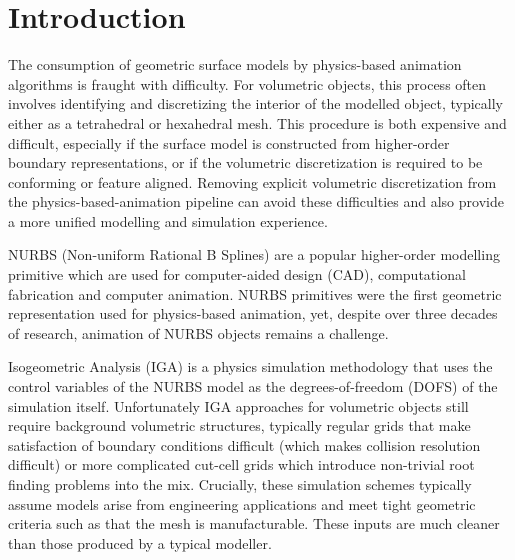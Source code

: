 \section{Introduction}

The consumption of geometric surface models by physics-based animation algorithms is fraught with difficulty. 
For volumetric objects, this process often involves identifying and discretizing the interior of the modelled object, 
typically either as a tetrahedral or hexahedral mesh.%
This procedure is both expensive and difficult, especially if the surface model is constructed from higher-order boundary
representations, or if the volumetric discretization is required to be conforming or feature aligned. 
Removing explicit volumetric discretization from the physics-based-animation pipeline can avoid these difficulties and 
also provide a more unified modelling and simulation experience. 

NURBS (Non-uniform Rational B Splines) are a popular higher-order modelling primitive which 
are used for computer-aided design (CAD), computational fabrication and computer animation. 
NURBS primitives were the first geometric representation used for physics-based animation, yet,
despite over three decades of research, animation of NURBS objects remains a challenge.

Isogeometric Analysis (IGA) is a physics simulation methodology that uses the control variables of the NURBS model
as the degrees-of-freedom (DOFS) of the simulation itself. 
Unfortunately IGA approaches for volumetric objects still require background volumetric structures, typically
regular grids that make satisfaction of boundary conditions difficult (which makes collision resolution difficult)
or more complicated cut-cell grids which introduce non-trivial root finding problems into the mix. 
Crucially, these simulation schemes typically assume models arise from engineering applications and meet tight geometric
criteria such as that the mesh is manufacturable. 
These inputs are much cleaner than those produced by a typical modeller. 


